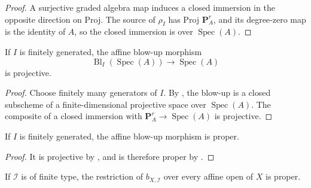 \begin{proof}
  \leanok
  A surjective graded algebra map induces a closed immersion in the opposite
  direction on Proj.  The source of $\rho_I$ has Proj $\mathbf P^r_A$, and
  its degree-zero map is the identity of $A$, so the closed immersion is over
  $\operatorname{Spec}(A)$.
\end{proof}


\begin{proposition}
  \label{prop:nagata-affine-blowup-projective}
  \leanok

  If \(I\) is finitely generated, the affine blow-up morphism
  \[
    \operatorname{Bl}_I(\operatorname{Spec}(A))
      \longrightarrow\operatorname{Spec}(A)
  \]
  is projective.
\end{proposition}

\begin{proof}
  \leanok
  Choose finitely many generators of \(I\).  By
  , the blow-up is a
  closed subscheme of a finite-dimensional projective space over
  \(\operatorname{Spec}(A)\).  The composite of a closed immersion with
  \(\mathbf P^r_A\to\operatorname{Spec}(A)\) is projective.
\end{proof}

\begin{lemma}
  \label{lemma:nagata-affine-blowup-proper}
  \leanok

  If \(I\) is finitely generated, the affine blow-up morphism is proper.
\end{lemma}

\begin{proof}
  \leanok
  It is projective by , and is
  therefore proper by .
\end{proof}

\begin{lemma}
  \label{lemma:nagata-global-blowup-proper-local}
  \leanok

  If $\mathcal I$ is of finite type, the restriction of
  $b_{X,\mathcal I}$ over every affine open of $X$ is proper.
\end{lemma}

